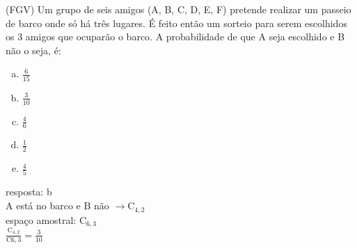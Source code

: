 \begin{ex}
 (FGV) Um grupo de seis amigos (A, B, C, D, E, F) pretende realizar um passeio de barco onde só há três lugares. É feito então um sorteio para serem escolhidos os 3 amigos que ocuparão o barco. A probabilidade de que A seja escolhido e B não o seja, é:
    \begin{enumerate}[(a)]
    \item $\frac{6}{15}$
    \item $\frac{3}{10}$
    \item $\frac{4}{6}$
    \item $\frac{1}{2}$
    \item $\frac{4}{5}$
    \end{enumerate}
      \begin{sol}
        resposta: b \\
        A está no barco e B não $\longrightarrow \mathrm{C}_{4,2}$ \\
        espaço amostral: $\mathrm{C}_{6,3}$\\
        $\frac{\mathrm{C}_{4,2}}{\mathrm{C}{6,3}}=\frac{3}{10}$
      \end{sol}
\end{ex}